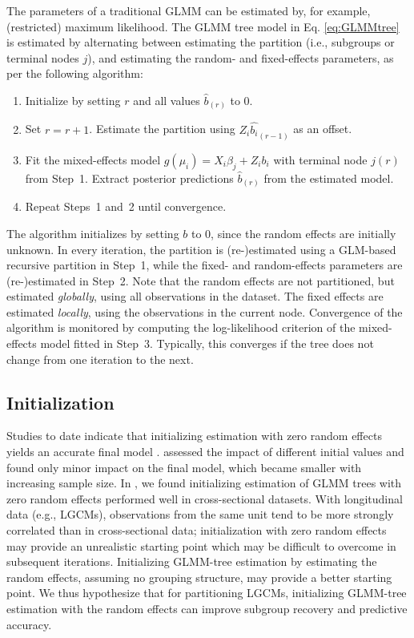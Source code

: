\documentclass[doc,floatsintext,natbib]{apa7}
\begin{document}
The parameters of a traditional GLMM can be estimated by, for example, (restricted) maximum likelihood. The GLMM tree model in Eq. \ref{eq:GLMMtree} is estimated by alternating between estimating the partition (i.e., subgroups or terminal nodes $j$), and estimating the random- and fixed-effects parameters, as per the following algorithm: 

\begin{enumerate}
\setlength\itemsep{0em}
	\setcounter{enumi}{-1}
	\item Initialize by setting $r$ and all values $\hat{b}_{(r)}$ to 0.
	\item Set $r = r+1$. Estimate the partition using $Z_{i} \hat{b_i}_{(r-1)}$ as an offset.
	\item Fit the mixed-effects model $g(\mu_{i}) = X_{i} \beta_{j} + Z_{i} b_i$ with terminal node $j(r)$ from Step~1. Extract posterior predictions $\hat{b}_{(r)}$ from the estimated model.
	\item Repeat Steps~1 and~2 until convergence.
\end{enumerate}

The algorithm initializes by setting $b$ to $0$, since the random effects are initially unknown. In every iteration, the partition is (re-)estimated using a GLM-based recursive partition in Step~1, while the fixed- and random-effects parameters are (re-)estimated in Step~2. Note that the random effects are not partitioned, but estimated \textit{globally}, using all observations in the dataset. The fixed effects are estimated \textit{locally}, using the observations in the current node. Convergence of the algorithm is monitored by computing the log-likelihood criterion of the mixed-effects model fitted in Step~3. Typically, this converges if the tree does not change from one iteration to the next. 


\subsection{Initialization}

Studies to date indicate that initializing estimation with zero random effects yields an accurate final model \citep{HajjyBell11, HajjyBell14, HajjyLaro17, SelaySimo12, FuySimo15, FokkySmit18}. \cite{SelaySimo12} assessed the impact of different initial values and found only minor impact on the final model, which became smaller with increasing sample size. In \cite{FokkySmit18}, we found initializing estimation of GLMM trees with zero random effects performed well in cross-sectional datasets. With longitudinal data (e.g., LGCMs), observations from the same unit tend to be more strongly correlated than in cross-sectional data; initialization with zero random effects may provide an unrealistic starting point which may be difficult to overcome in subsequent iterations. Initializing GLMM-tree estimation by estimating the random effects, assuming no grouping structure, may provide a better starting point. We thus hypothesize that for partitioning LGCMs, initializing GLMM-tree estimation with the random effects can improve subgroup recovery and predictive accuracy.
\end{document}
